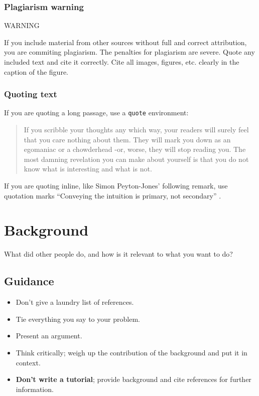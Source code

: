 \documentclass{l4proj}
\begin{document}
\subsection{Plagiarism warning}

\begin{highlight_title}{WARNING}
    
    If you include material from other sources without full and correct attribution, you are commiting plagiarism. The penalties for plagiarism are severe.
    Quote any included text and cite it correctly. Cite all images, figures, etc. clearly in the caption of the figure.
\end{highlight_title}

\subsection{Quoting text}

If you are quoting a long passage, use a \texttt{quote} environment:

\begin{quote}
     If you scribble your thoughts any which way, your readers will surely feel that you care nothing about them. They will mark you down as an egomaniac or a chowderhead -or, worse, they will stop reading you. The most damning revelation you can make about yourself is that you do not know what is interesting and what is not.
\end{quote} \citep{Von80}

If you are quoting inline, like Simon Peyton-Jones' following remark, use quotation marks ``Conveying the intuition is primary, not
secondary'' \citep{Pey17}.


\chapter{Background}
What did other people do, and how is it relevant to what you want to do?
\section{Guidance}
\begin{itemize}    
    \item
      Don't give a laundry list of references.
    \item
      Tie everything you say to your problem.
    \item
      Present an argument.
    \item Think critically; weigh up the contribution of the background and put it in context.    
    \item
      \textbf{Don't write a tutorial}; provide background and cite
      references for further information.
\end{itemize}
\end{document}
